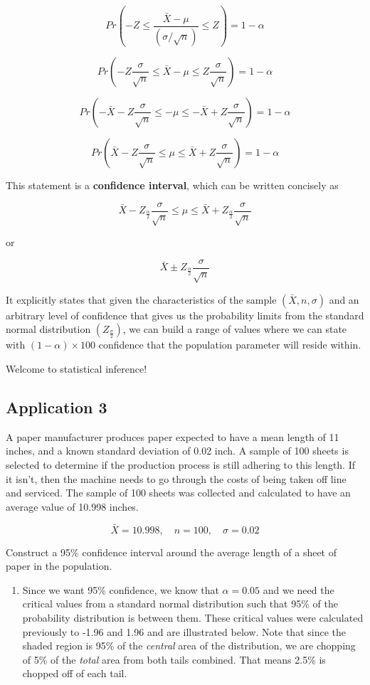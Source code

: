 \documentclass[
]{book}
\providecommand{\tightlist}{%
  \setlength{\itemsep}{0pt}\setlength{\parskip}{0pt}}
\begin{document}
\[Pr\left(-Z \leq \frac{\bar{X}-\mu}{(\sigma/\sqrt{n})} \leq Z\right)=1-\alpha\]

\[Pr\left(-Z\frac{\sigma}{\sqrt{n}} \leq \bar{X}-\mu \leq Z\frac{\sigma}{\sqrt{n}}\right)=1-\alpha\]

\[Pr\left(-\bar{X}-Z\frac{\sigma}{\sqrt{n}} \leq -\mu \leq -\bar{X}+Z\frac{\sigma}{\sqrt{n}}\right)=1-\alpha\]

\[Pr\left(\bar{X}-Z\frac{\sigma}{\sqrt{n}} \leq \mu \leq \bar{X}+Z\frac{\sigma}{\sqrt{n}}\right)=1-\alpha\]

This statement is a \textbf{confidence interval}, which can be written concisely as

\[\bar{X}-Z_{\frac{\alpha}{2}}\frac{\sigma}{\sqrt{n}} \leq \mu \leq \bar{X}+Z_{\frac{\alpha}{2}}\frac{\sigma}{\sqrt{n}}\]

or

\[\bar{X} \pm Z_{\frac{\alpha}{2}}\frac{\sigma}{\sqrt{n}}\]

It explicitly states that given the characteristics of the sample \((\bar{X},n,\sigma)\) and an arbitrary level of confidence that gives us the probability limits from the standard normal distribution \((Z_{\frac{\sigma}{2}})\), we can build a range of values where we can state with \((1-\alpha) \times 100%
\) confidence that the population parameter will reside within.

Welcome to statistical inference!

\subsection{Application 3}\label{application-3}

A paper manufacturer produces paper expected to have a mean length of 11 inches, and a known standard deviation of 0.02 inch. A sample of 100 sheets is selected to determine if the production process is still adhering to this length. If it isn't, then the machine needs to go through the costs of being taken off line and serviced. The sample of 100 sheets was collected and calculated to have an average value of 10.998 inches.

\[\bar{X} = 10.998, \quad n = 100, \quad \sigma = 0.02\]

Construct a 95\% confidence interval around the average length of a sheet of paper in the population.

\begin{enumerate}
\def\labelenumi{\arabic{enumi}.}
\tightlist
\item
  Since we want 95\% confidence, we know that \(\alpha = 0.05\) and we need the critical values from a standard normal distribution such that 95\% of the probability distribution is between them. These critical values were calculated previously to -1.96 and 1.96 and are illustrated below. Note that since the shaded region is 95\% of the \emph{central} area of the distribution, we are chopping of 5\% of the \emph{total} area from both tails combined. That means 2.5\% is chopped off of each tail.
\end{enumerate}
\end{document}
